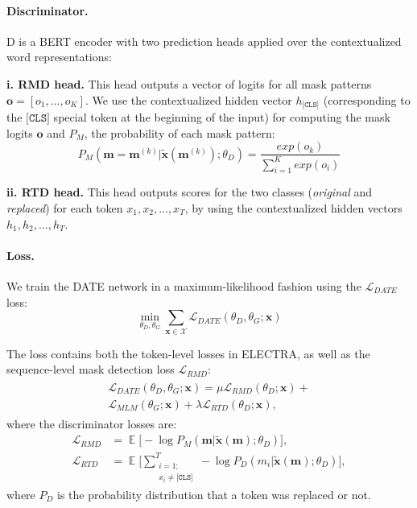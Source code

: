 \documentclass[11pt]{article}
\newcommand{\bx}{\bm{x}}
\newcommand{\E}{\mathop{\mathbb{E}}}
\begin{document}
\paragraph{Discriminator.} D is a BERT encoder with two prediction heads applied over the contextualized word representations:

\noindent \textbf{i. RMD head.} This head outputs a vector of logits for all mask patterns $\bm{o}=[o_1,...,o_K]$. We use the contextualized hidden vector $h_{\texttt{[CLS]}}$ (corresponding to the $\texttt{[CLS]}$ special token at the beginning of the input) for computing the mask logits $\bm{o}$ and $P_M$, the probability of each mask pattern:
\begin{equation}
    P_{M}(\bm{m}=\bm{m}^{(k)}|\widetilde{\bx}(\bm{m}^{(k)}); \theta_D)=\frac{exp(o_k)}{\sum_{i=1}^{K} exp(o_i)}
\end{equation}

\noindent \textbf{ii. RTD head.} This head outputs scores for the two classes (\emph{original} and \emph{replaced}) for each token $x_1, x_2, ..., x_T$, by using the contextualized hidden vectors $h_1, h_2, ..., h_T$.

\paragraph{Loss.} We train the DATE network in a maximum-likelihood fashion using the $\mathcal{L}_{DATE}$ loss:
\begin{equation}
     \min_{\theta_D, \theta_G}  \sum_{\bx \in \mathcal{X}} \mathcal{L}_{DATE}(\theta_D,\theta_G;\bx)
\end{equation}

\noindent The loss contains both the token-level losses in ELECTRA, as well as the sequence-level mask detection loss $\mathcal{L}_{RMD}$:
\begin{align}
\begin{split}
    \mathcal{L}_{DATE}(\theta_D,\theta_G;\bx) = \mu\mathcal{L}_{RMD}(\theta_D;\bx) +
    \\\mathcal{L}_{MLM}(\theta_G;\bx) + \lambda\mathcal{L}_{RTD}(\theta_D;\bx),
\end{split}
\end{align}
where the discriminator losses are:
\begin{align}
    \mathcal{L}_{RMD}&=\E \biggl[-\log P_{M}(\bm{m}|\widetilde{\bx}(\bm{m});\theta_D)\biggr], \\
    \mathcal{L}_{RTD}&=\E\biggl[ \sum_{\substack{i=1;\\x_i\ne \texttt{[CLS]}}}^{T} -\log P_D(m_i|\bm{\widetilde{\bx}}(\bm{m});\theta_D)\biggr],
\end{align}
where $P_D$ is the probability distribution that a token was replaced or not.
\end{document}
